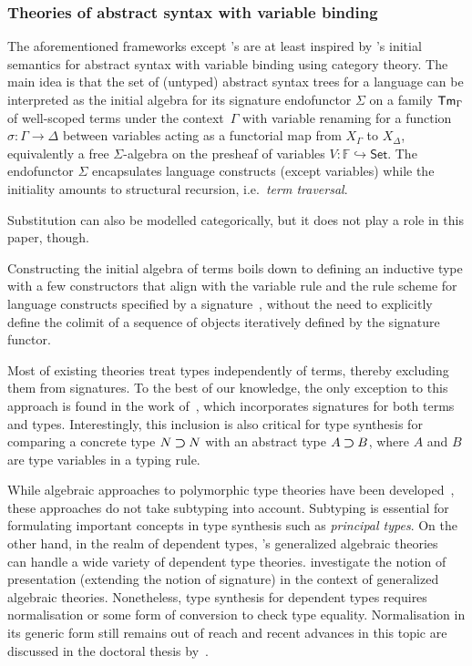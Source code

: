 \subsubsection{Theories of abstract syntax with variable binding}\label{sec:theory-of-syntax}
The aforementioned frameworks except \citeauthor{Gheri2020}'s are at least inspired by \citet{Fiore1999}'s initial semantics for abstract syntax with variable binding using category theory.
The main idea is that the set of (untyped) abstract syntax trees for a language can be interpreted as the initial algebra for its signature endofunctor $\mathbb{\Sigma}$ on a family $\mathsf{Tm}_{\Gamma}$ of well-scoped terms under the context~$\Gamma$ with
variable renaming for a function $\sigma\colon \Gamma \to \Delta$ between variables acting as a functorial map from $X_{\Gamma}$ to $X_{\Delta}$, equivalently a free $\mathbb{\Sigma}$-algebra on the presheaf of variables $V\colon \mathbb{F} \hookrightarrow \mathsf{Set}$.
The endofunctor $\mathbb{\Sigma}$ encapsulates language constructs (except variables) while the initiality amounts to structural recursion, i.e.\ \emph{term traversal}.

Substitution can also be modelled categorically, but it does not play a role in this paper, though.

\begin{remark}
Constructing the initial algebra of terms boils down to defining an inductive type with a few constructors that align with the variable rule and the rule scheme for language constructs specified by a signature~\citep{Allais2021,Fiore2022}, without the need to explicitly define the colimit of a sequence of objects iteratively defined by the signature functor.
\end{remark}

\begin{remark} \label{re:type-signature}
Most of existing theories treat types independently of terms, thereby excluding them from signatures.
To the best of our knowledge, the only exception to this approach is found in the work of~\citet{Arkor2020}, which incorporates signatures for both terms and types.
Interestingly, this inclusion is also critical for type synthesis for comparing a concrete type $N \mathbin{\bm{\supset}} N$ with an abstract type $A \mathbin{\bm{\supset}} B$, where $A$ and $B$ are type variables in a typing rule.
\end{remark}

While algebraic approaches to polymorphic type theories have been developed~\citep{Fiore2013,Hamana2011}, these approaches do not take subtyping into account.
Subtyping is essential for formulating important concepts in type synthesis such as \emph{principal types}.
On the other hand, in the realm of dependent types, \citeauthor{Cartmell1986}'s generalized algebraic theories~\citeyearpar{Cartmell1986} can handle a wide variety of dependent type theories.
\citet{Bezem2021} investigate the notion of presentation (extending the notion of signature) in the context of generalized algebraic theories.
Nonetheless, type synthesis for dependent types requires normalisation or some form of conversion to check type equality.
Normalisation in its generic form still remains out of reach and recent advances in this topic are discussed in the doctoral thesis by~\citet{Valliappan2023}.

